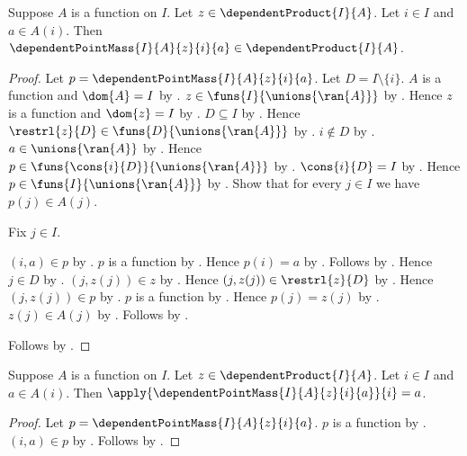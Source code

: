 \begin{proposition}\label{spike_dependent_point_mass_type}
    Suppose $A$ is a function on $I$.
    Let $z\in\dependentProduct{I}{A}$.
    Let $i\in I$ and $a\in A(i)$.
    Then
        $\dependentPointMass{I}{A}{z}{i}{a}
            \in\dependentProduct{I}{A}$.
\end{proposition}
\begin{proof}
    Let $p=\dependentPointMass{I}{A}{z}{i}{a}$.
    Let $D=I\setminus\{i\}$.
    $A$ is a function and $\dom{A}=I$ by \auto.
    $z\in\funs{I}{\unions{\ran{A}}}$ by
        .
    Hence $z$ is a function and $\dom{z}=I$ by
        .
    $D\subseteq I$ by .
    Hence $\restrl{z}{D}\in
        \funs{D}{\unions{\ran{A}}}$ by .
    $i\notin D$ by .
    $a\in\unions{\ran{A}}$ by
        .
    Hence
        $p\in\funs{\cons{i}{D}}{\unions{\ran{A}}}$ by
        .
    $\cons{i}{D}=I$ by .
    Hence $p\in\funs{I}{\unions{\ran{A}}}$ by \auto.
    Show that for every $j\in I$ we have $p(j)\in A(j)$.
    \begin{subproof}
        Fix $j\in I$.
        \begin{byCase}
            $(i,a)\in p$ by
                .
            $p$ is a function by .
            Hence $p(i)=a$ by .
            Follows by \auto.
            Hence $j\in D$ by .
            $(j,z(j))\in z$ by .
            Hence $(j,z(j))\in\restrl{z}{D}$ by
                .
            Hence $(j,z(j))\in p$ by
                .
            $p$ is a function by .
            Hence $p(j)=z(j)$ by .
            $z(j)\in A(j)$ by
                .
            Follows by \auto.
        \end{byCase}
    \end{subproof}
    Follows by .
\end{proof}

\begin{proposition}\label{spike_dependent_point_mass_selected}
    Suppose $A$ is a function on $I$.
    Let $z\in\dependentProduct{I}{A}$.
    Let $i\in I$ and $a\in A(i)$.
    Then $\apply{\dependentPointMass{I}{A}{z}{i}{a}}{i}=a$.
\end{proposition}
\begin{proof}
    Let $p=\dependentPointMass{I}{A}{z}{i}{a}$.
    $p$ is a function by
        .
    $(i,a)\in p$ by
        .
    Follows by .
\end{proof}

